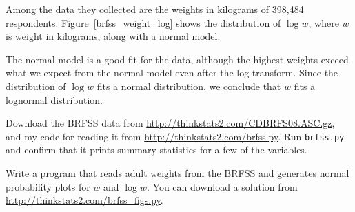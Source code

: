 \documentclass[12pt]{book}
\begin{document}
Among the data they collected are the weights in kilograms of
398,484 respondents.
Figure~\ref{brfss_weight_log} shows the distribution
of $\log w$, where $w$ is weight in kilograms, along with a normal
model.

The normal model is a good fit for the data, although the highest
weights exceed what we expect from the normal model even after the log
transform.  Since the distribution of $\log w$ fits a normal
distribution, we conclude that $w$ fits a lognormal distribution.
 
 
 






\begin{exercise}
Download the BRFSS data from 
\url{http://thinkstats2.com/CDBRFS08.ASC.gz}, and my code for reading it
from
\url{http://thinkstats2.com/brfss.py}.  Run {\tt brfss.py} and confirm that
it prints summary statistics for a few of the variables.

Write a program that reads adult weights from the BRFSS and
generates normal probability plots for $w$ and $\log w$.  You can
download a solution from \url{http://thinkstats2.com/brfss_figs.py}.

\end{exercise}
\end{document}
